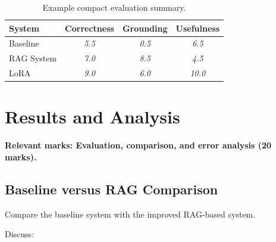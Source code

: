 \documentclass[10pt,conference]{IEEEtran}
\begin{document}
\begin{table}[h]
\centering
\caption{Example compact evaluation summary.}
\label{tab:evaluation-summary}
\begin{tabularx}{\linewidth}{lccc}
\toprule
System & Correctness & Grounding & Usefulness \\
\midrule
Baseline & \emph{5.5} & \emph{0.5} & \emph{6.5} \\
RAG System & \emph{7.0} & \emph{8.5} & \emph{4.5} \\    
LoRA & \emph{9.0} & \emph{6.0} & \emph{10.0} \\
\bottomrule
\end{tabularx}
\end{table}

\section{Results and Analysis}
\label{sec:results}

\textbf{Relevant marks: Evaluation, comparison, and error analysis (20 marks).}



\subsection{Baseline versus RAG Comparison}

Compare the baseline system with the improved RAG-based system.

Discuss:
\end{document}
